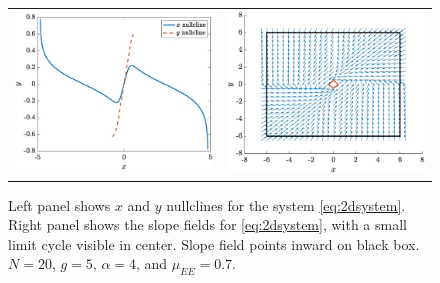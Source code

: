 \documentclass[reqno]{siamonline190516}
\begin{document}
\begin{figure}
    \centering
    \begin{tabular}{cc}
    \includegraphics[width=7.8cm]{images/nullclines.eps} &
    \includegraphics[width=7.8cm]{images/trappingregion.eps}
    \end{tabular}
    \caption{Left panel shows $x$ and $y$ nullclines for the system \cref{eq:2dsystem}. Right panel shows the slope fields for \cref{eq:2dsystem}, with a small limit cycle visible in center.  Slope field points inward on black box. $N = 20$, $g = 5$, $\alpha = 4$, and $\mu_{EE} = 0.7$.}
    \label{fig:nullclines}
\end{figure}
\end{document}
